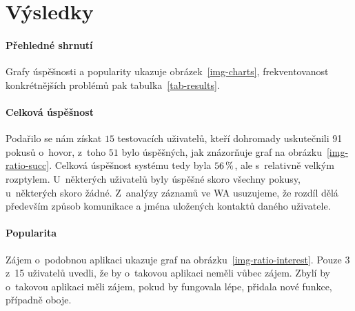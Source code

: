 \section{Výsledky}\label{results}

\paragraph{Přehledné shrnutí} Grafy úspěšnosti a popularity ukazuje obrázek~\ref{img-charts},
frekventovanost konkrétnějších problémů pak tabulka~\ref{tab-results}.

\paragraph{Celková úspěšnost} Podařilo se nám získat \(15\) testovacích uživatelů, kteří dohromady uskutečnili 91
pokusů o~hovor, z~toho \(51\) bylo úspěšných, jak znázorňuje
graf na obrázku~\ref{img-ratio-succ}. Celková úspěšnost
systému tedy byla \(56\,\rm \%\), ale s~relativně velkým rozptylem. U~některých uživatelů
byly úspěšné skoro všechny pokusy, u~některých skoro žádné. Z~analýzy záznamů ve WA usuzujeme,
že rozdíl dělá především způsob komunikace a jména uložených kontaktů daného
uživatele.

\paragraph{Popularita} Zájem o~podobnou aplikaci ukazuje graf na obrázku~\ref{img-ratio-interest}.
Pouze 3 z~15 uživatelů uvedli, že by o~takovou aplikaci neměli vůbec zájem.
Zbylí by o~takovou aplikaci měli zájem, pokud by fungovala lépe, přidala nové funkce,
případně oboje.


